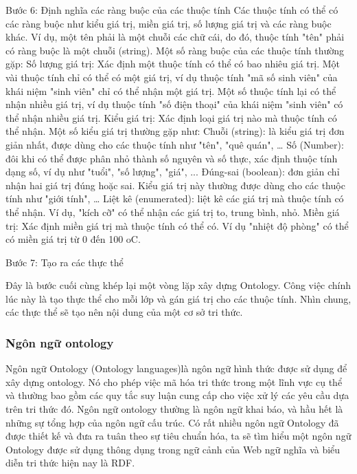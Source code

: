 Bước 6: Định nghĩa các ràng buộc của các thuộc tính
Các thuộc tính có thể có các ràng buộc như kiểu giá trị, miền giá trị, số lượng giá trị và các ràng buộc khác. Ví dụ, một tên phải là một chuỗi các chữ cái, do đó, thuộc tính "tên" phải có ràng buộc là một chuỗi (string). 
Một số ràng buộc của các thuộc tính thường gặp:
Số lượng giá trị: Xác định một thuộc tính có thể có bao nhiêu giá trị. Một vài thuộc tính chỉ có thể có một giá trị, ví dụ thuộc tính "mã số sinh viên" của khái niệm "sinh viên" chỉ có thể nhận một giá trị. Một số thuộc tính lại có thể nhận nhiều giá trị, ví dụ thuộc tính "số điện thoại" của khái niệm "sinh viên" có thể nhận nhiều giá trị.
Kiểu giá trị: Xác định loại giá trị nào mà thuộc tính có thể nhận. Một số kiểu giá trị thường gặp như:
Chuỗi (string): là kiểu giá trị đơn giản nhất, được dùng cho các thuộc tính như "tên", "quê quán", …
Số (Number): đôi khi có thể được phân nhỏ thành số nguyên và số thực, xác định thuộc tính dạng số, ví dụ như "tuổi", "số lượng", "giá", ...
Đúng-sai (boolean): đơn giản chỉ nhận hai giá trị đúng hoặc sai. Kiểu giá trị này thường được dùng cho các thuộc tính như "giới tính", …
Liệt kê (enumerated): liệt kê các giá trị mà thuộc tính có thể nhận. Ví dụ, "kích cỡ" có thể nhận các giá trị to, trung bình, nhỏ.
Miền giá trị: Xác định miền giá trị mà thuộc tính có thể có. Ví dụ "nhiệt độ phòng" có thể có miền giá trị từ 0 đến 100 oC.  

Bước 7: Tạo ra các thực thể
 
Đây là bước cuối cùng khép lại một vòng lặp xây dựng Ontology. Công việc chính lúc này là tạo thực thể cho mỗi lớp và gán giá trị cho các thuộc tính. Nhìn chung, các thực thể sẽ tạo nên nội dung của một cơ sở tri thức. 


\subsubsection{Ngôn ngữ ontology}
Ngôn ngữ Ontology (Ontology languages)là ngôn ngữ hình thức được sử dụng để xây dựng ontology. Nó cho phép việc mã hóa tri thức trong một lĩnh vực cụ thể và thường bao gồm các quy tắc suy luận cung cấp cho việc xử lý các yêu cầu dựa trên tri thức đó. Ngôn ngữ ontology thường là ngôn ngữ khai báo, và hầu hết là những sự tổng hợp của ngôn ngữ cấu trúc. Có rất nhiều ngôn ngữ Ontology đã được thiết kế và đưa ra tuân theo sự tiêu chuẩn hóa, ta sẽ tìm hiểu một ngôn ngữ Ontology được sử dụng thông dụng trong ngữ cảnh của Web ngữ nghĩa và biểu diễn tri thức hiện nay là RDF. 

